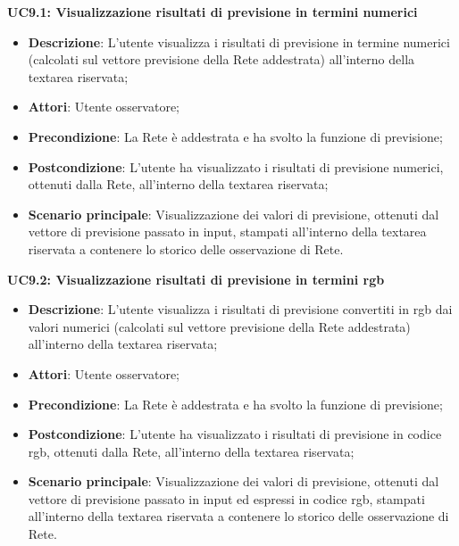 \textbf{UC9.1: Visualizzazione risultati di previsione in termini numerici}\mbox{}
\label{UC9.1: Visualizzazione risultati di previsione in termini numerici}
\noindent
\begin{itemize}
\item \textbf{Descrizione}: L'utente visualizza i risultati di previsione in termine numerici (calcolati sul vettore previsione della Rete addestrata) all'interno della textarea riservata;
\item \textbf{Attori}: Utente osservatore;
\item \textbf{Precondizione}: La Rete \`e addestrata e ha svolto la funzione di previsione;
\item \textbf{Postcondizione}: L'utente ha visualizzato i risultati di previsione numerici, ottenuti dalla Rete, all'interno della textarea riservata;
\item \textbf{Scenario principale}: Visualizzazione dei valori di previsione, ottenuti dal vettore di previsione passato in input, stampati all'interno della textarea riservata a contenere lo storico delle osservazione di Rete.
\end{itemize}

\textbf{UC9.2: Visualizzazione risultati di previsione in termini rgb}\mbox{}
\label{UC9.2: Visualizzazione risultati di previsione in termini rgb}
\noindent
\begin{itemize}
\item \textbf{Descrizione}: L'utente visualizza i risultati di previsione convertiti in rgb dai valori numerici (calcolati sul vettore previsione della Rete addestrata) all'interno della textarea riservata;
\item \textbf{Attori}: Utente osservatore;
\item \textbf{Precondizione}: La Rete \`e addestrata e ha svolto la funzione di previsione;
\item \textbf{Postcondizione}: L'utente ha visualizzato i risultati di previsione in codice rgb, ottenuti dalla Rete, all'interno della textarea riservata;
\item \textbf{Scenario principale}: Visualizzazione dei valori di previsione, ottenuti dal vettore di previsione passato in input ed espressi in codice rgb, stampati all'interno della textarea riservata a contenere lo storico delle osservazione di Rete.
\end{itemize}

